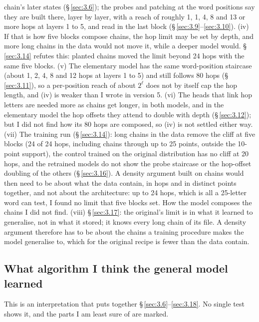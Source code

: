 \documentclass[paper=a4,fontsize=11pt,DIV=11,parskip=half,headings=small,numbers=noendperiod]{scrartcl}
\begin{document}
\begin{itemize}
  chain’s later states (\S\,\ref{sec:3.6}); the probes and patching at the word positions say they are built
  there, layer by layer, with a reach of roughly 1, 1, 4, 8 and 13 or more hops at layers 1 to 5, and read in
  the last block (\S\,\ref{sec:3.9}–\ref{sec:3.10}). (iv) If that is how five blocks compose chains, the hop
  limit may be set by depth, and more long chains in the data would not move it, while a deeper model would.
  \S\,\ref{sec:3.14} refutes this: planted chains moved the limit beyond 24 hops with the same five blocks. (v)
  The elementary model has the same word-position staircase (about 1, 2, 4, 8 and 12 hops at layers 1 to 5) and
  still follows 80 hops (\S\,\ref{sec:3.11}), so a per-position reach of about $2^\ell$ does not by itself cap
  the hop length, and (iv) is weaker than I wrote in version 5. (vi) The heads that link hop letters are needed
  more as chains get longer, in both models, and in the elementary model the hop offsets they attend to double
  with depth (\S\,\ref{sec:3.12}); but I did not find how its 80 hops are composed, so (iv) is not settled
  either way. (vii) The training run (\S\,\ref{sec:3.14}): long chains in the data remove the cliff at five
  blocks (24 of 24 hops, including chains through up to 25 points, outside the 10-point support), the control
  trained on the original distribution has no cliff at 20 hops, and the retrained models do not show the probe
  staircase or the hop-offset doubling of the others (\S\,\ref{sec:3.16}). A density argument built on chains
  would then need to be about what the data contain, in hops and in distinct points together, and not about the
  architecture: up to 24 hops, which is all a 25-letter word can test, I found no limit that five blocks set.
  How the model composes the chains I did not find. (viii) \S\,\ref{sec:3.17}: the original’s limit is in what
  it learned to generalise, not in what it stored; it knows every long chain of its file. A density argument
  therefore has to be about the chains a training procedure makes the model generalise to, which for the
  original recipe is fewer than the data contain.
\end{itemize}

\subsection{What algorithm I think the general model learned}\label{sec:4.1}
This is an interpretation that puts together \S\,\ref{sec:3.6}–\ref{sec:3.18}. No single test shows it, and the
parts I am least sure of are marked.
\end{document}
